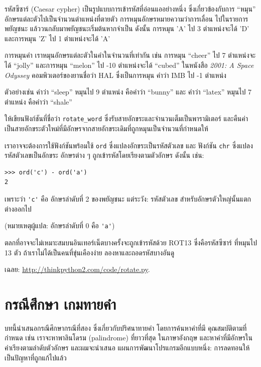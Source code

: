 \begin{exercise}

\label{exrotate}
รหัสซีซาร์ (Caesar cypher) เป็นรูปแบบการเข้ารหัสที่อ่อนแออย่างหนึ่ง ซึ่งเกี่ยวข้องกับการ 
``หมุน'' อักษรแต่ละตัวไปเป็นจำนวนตำแหน่งที่ตายตัว การหมุนอักษรหมายความว่าการเลื่อน
ไปในรายการพยัญชนะ แล้ววนกลับมาพยัญชนะเริ่มต้นหากจำเป็น ดังนั้น การหมุน 'A' ไป 3
ตำแหน่งจะได้ 'D' และการหมุน 'Z' ไป 1 ตำแหน่งจะได้ 'A'

การหมุนคำ เราหมุนอักษรแต่ละตัวในคำในจำนวนที่เท่ากัน เช่น การหมุน ``cheer'' ไป 7
ตำแหน่งจะได้ ``jolly'' และการหมุน ``melon'' ไป -10 ตำแหน่งจะได้ ``cubed''
ในหนังสือ {\em 2001: A Space Odyssey} คอมพิวเตอร์ของยานชื่อว่า HAL ซึ่งเป็นการหมุน
คำว่า IMB ไป -1 ตำแหน่ง 

ตัวอย่างเช่น คำว่า ``sleep'' หมุนไป 9 ตำแหน่ง คือคำว่า ``bunny'' และ
คำว่า ``latex'' หมุนไป 7 ตำแหน่ง คือคำว่า ``shale''

ให้เขียนฟังก์ชันที่ชื่อว่า \verb"rotate_word" ซึ่งรับสายอักขระและจำนวนเต็มเป็นพารามิเตอร์
และคืนค่าเป็นสายอักขระตัวใหม่ที่มีอักษรจากสายอักขระเดิมที่ถูกหมุนเป็นจำนวนที่กำหนดให้

เราอาจจะต้องการใช้ฟังก์ชันพร้อมใช้ {\tt ord} ซึ่งแปลงอักขระเป็นรหัสตัวเลข และ ฟังก์ชัน 
{\tt chr} ซึ่งแปลงรหัสตัวเลขเป็นอักขระ อักษรต่าง ๆ ถูกเข้ารหัสโดยเรียงตามตัวอักษร
ดังนั้น เช่น:

\begin{verbatim}
>>> ord('c') - ord('a')
2
\end{verbatim}

เพราะว่า \verb"'c'" คือ อักษรลำดับที่ 2 ของพยัญชนะ  แต่ระวัง: รหัสตัวเลข
สำหรับอักษรตัวใหญ่นั้นแตกต่างออกไป

(หมายเหตุผู้แปล: อักษรลำดับที่ 0 คือ \verb"'a'")

ตลกที่อาจจะไม่เหมาะสมบนอินเทอร์เน็ตบางครั้งจะถูกเข้ารหัสด้วย ROT13 ซึ่งคือรหัสซีซาร์
ที่หมุนไป 13 ตัว ถ้าเราไม่ได้เป็นคนที่ขุ่นเคืองง่าย ลองหาและถอดรหัสบางอันดู

เฉลย: \url{http://thinkpython2.com/code/rotate.py}.

\end{exercise}



\chapter{กรณีศึกษา เกมทายคำ } %
\label{wordplay}

บทนี้นำเสนอกรณีศึกษากรณีที่สอง ซึ่งเกี่ยวกับปริศนาทายคำ โดยการค้นหาคำที่มี
คุณสมบัติตามที่กำหนด เช่น เราจะหาพาลินโดรม (palindrome) ที่ยาวที่สุด
ในภาษาอังกฤษ และหาคำที่มีอักษรในคำเรียงตามลำดับตัวอักษร และผมจะนำเสนอ
แผนการพัฒนาโปรแกรมอีกแบบหนึ่ง: การลดทอนให้เป็นปัญหาที่ถูกแก้ไปแล้ว


